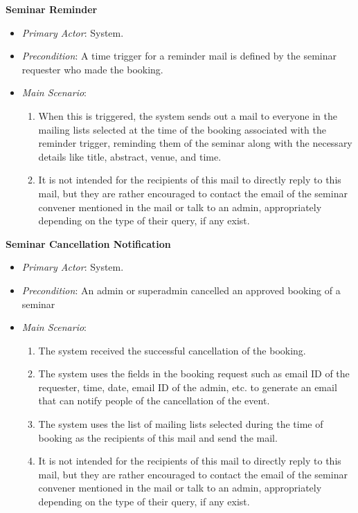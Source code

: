 \documentclass{article}
\begin{document}
\textbf{Seminar Reminder}
\label{ucseminarreminder}
\begin{itemize}
    \item \textit{Primary Actor}: System.
    \item \textit{Precondition}: A time trigger for a reminder mail is defined by the seminar requester who made the booking.
    \item \textit{Main Scenario}:
    \begin{enumerate}
        \item When this is triggered, the system sends out a mail to everyone in the mailing lists selected at the time of the booking associated with the reminder trigger, reminding them of the seminar along with the necessary details like title, abstract, venue, and time.
        \item It is not intended for the recipients of this mail to directly reply to this mail, but they are rather encouraged to contact the email of the seminar convener mentioned in the mail or talk to an admin, appropriately depending on the type of their query, if any exist.
    \end{enumerate} 
\end{itemize}

\textbf{Seminar Cancellation Notification}
\label{ucseminarcancellationnotification}
\begin{itemize}
    \item \textit{Primary Actor}: System.
    \item \textit{Precondition}: An admin or superadmin cancelled an approved booking of a seminar
    \item \textit{Main Scenario}:
    \begin{enumerate}
        \item The system received the successful cancellation of the booking.
        \item The system uses the fields in the booking request such as email ID of the requester, time, date, email ID of the admin, etc. to generate an email that can notify people of the cancellation of the event.
        \item The system uses the list of mailing lists selected during the time of booking as the recipients of this mail and send the mail.
        \item It is not intended for the recipients of this mail to directly reply to this mail, but they are rather encouraged to contact the email of the seminar convener mentioned in the mail or talk to an admin, appropriately depending on the type of their query, if any exist.
    \end{enumerate} 
\end{itemize}
\end{document}
